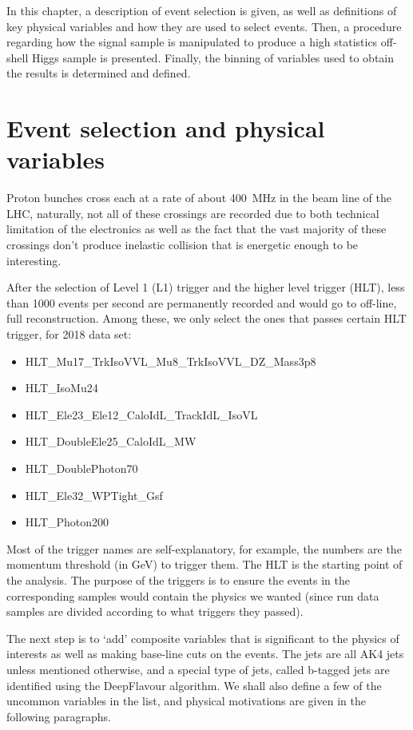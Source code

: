 In this chapter, a description of event selection is given, as well as definitions of
key physical variables and how they are used to select events. Then, a procedure regarding
how the signal sample is manipulated to produce a high statistics off-shell Higgs sample is presented.
Finally, the binning of variables used to obtain the results is determined and defined.

\section{Event selection and physical variables}
Proton bunches cross each at a rate of about \SI{400}{\mega\hertz} in the beam line of
the LHC, naturally, not all of these crossings are recorded due to both technical
limitation of the electronics as well as the fact that the vast majority of these
crossings don't produce inelastic collision that is energetic enough to be interesting.

After the selection of Level 1 (L1) trigger and the higher level trigger (HLT), less than 1000
events per second are permanently recorded and would go to off-line, full reconstruction. Among these,
we only select the ones that passes certain HLT trigger, for 2018 data set:
\begin{itemize}
    \item HLT\_Mu17\_TrkIsoVVL\_Mu8\_TrkIsoVVL\_DZ\_Mass3p8
    \item HLT\_IsoMu24
    \item HLT\_Ele23\_Ele12\_CaloIdL\_TrackIdL\_IsoVL
    \item HLT\_DoubleEle25\_CaloIdL\_MW
    \item HLT\_DoublePhoton70
    \item HLT\_Ele32\_WPTight\_Gsf
    \item HLT\_Photon200
\end{itemize}
Most of the trigger names are self-explanatory, for example, the numbers are the momentum 
threshold (in \si{\giga\electronvolt}) to trigger them. The HLT is the starting point of the analysis. The
purpose of the triggers is to ensure the events in the corresponding samples would contain the physics
we wanted (since run data samples are divided according to what triggers they passed).

The next step is to `add' composite variables that is significant to the physics of interests as
well as making base-line cuts on the events.
The jets are all AK4 jets unless mentioned otherwise, and a special type of jets, called b-tagged
jets are  identified using the DeepFlavour algorithm.\cite{deepflavour}  
We shall also define a few of the
uncommon variables in the list, and physical motivations are given in the following
paragraphs.

